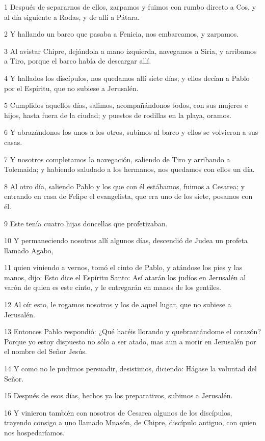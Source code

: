 \par 1 Después de separarnos de ellos, zarpamos y fuimos con rumbo directo a Cos, y al día siguiente a Rodas, y de allí a Pátara.
\par 2 Y hallando un barco que pasaba a Fenicia, nos embarcamos, y zarpamos.
\par 3 Al avistar Chipre, dejándola a mano izquierda, navegamos a Siria, y arribamos a Tiro, porque el barco había de descargar allí.
\par 4 Y hallados los discípulos, nos quedamos allí siete días; y ellos decían a Pablo por el Espíritu, que no subiese a Jerusalén.
\par 5 Cumplidos aquellos días, salimos, acompañándonos todos, con sus mujeres e hijos, hasta fuera de la ciudad; y puestos de rodillas en la playa, oramos.
\par 6 Y abrazándonos los unos a los otros, subimos al barco y ellos se volvieron a sus casas.
\par 7 Y nosotros completamos la navegación, saliendo de Tiro y arribando a Tolemaida; y habiendo saludado a los hermanos, nos quedamos con ellos un día.
\par 8 Al otro día, saliendo Pablo y los que con él estábamos, fuimos a Cesarea; y entrando en casa de Felipe el evangelista, que era uno de los siete, posamos con él.
\par 9 Este tenía cuatro hijas doncellas que profetizaban.
\par 10 Y permaneciendo nosotros allí algunos días, descendió de Judea un profeta llamado Agabo,
\par 11 quien viniendo a vernos, tomó el cinto de Pablo, y atándose los pies y las manos, dijo: Esto dice el Espíritu Santo: Así atarán los judíos en Jerusalén al varón de quien es este cinto, y le entregarán en manos de los gentiles.
\par 12 Al oír esto, le rogamos nosotros y los de aquel lugar, que no subiese a Jerusalén.
\par 13 Entonces Pablo respondió: ¿Qué hacéis llorando y quebrantándome el corazón? Porque yo estoy dispuesto no sólo a ser atado, mas aun a morir en Jerusalén por el nombre del Señor Jesús.
\par 14 Y como no le pudimos persuadir, desistimos, diciendo: Hágase la voluntad del Señor.
\par 15 Después de esos días, hechos ya los preparativos, subimos a Jerusalén.
\par 16 Y vinieron también con nosotros de Cesarea algunos de los discípulos, trayendo consigo a uno llamado Mnasón, de Chipre, discípulo antiguo, con quien nos hospedaríamos.

